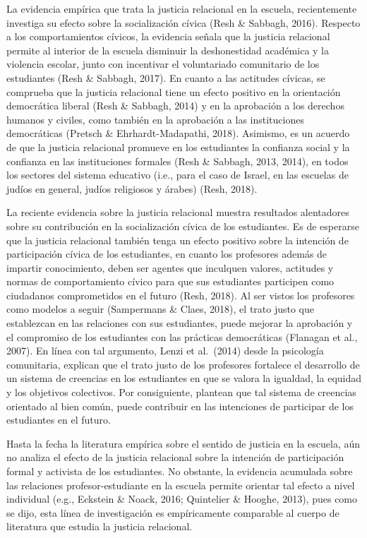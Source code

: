 \documentclass[12pt,twoside]{templates/facsothesis}
\begin{document}
La evidencia empírica que trata la justicia relacional en la escuela, recientemente investiga su efecto sobre la socialización cívica (Resh \& Sabbagh, 2016). Respecto a los comportamientos cívicos, la evidencia señala que la justicia relacional permite al interior de la escuela disminuir la deshonestidad académica y la violencia escolar, junto con incentivar el voluntariado comunitario de los estudiantes (Resh \& Sabbagh, 2017). En cuanto a las actitudes cívicas, se comprueba que la justicia relacional tiene un efecto positivo en la orientación democrática liberal (Resh \& Sabbagh, 2014) y en la aprobación a los derechos humanos y civiles, como también en la aprobación a las instituciones democráticas (Pretsch \& Ehrhardt-Madapathi, 2018). Asimismo, es un acuerdo de que la justicia relacional promueve en los estudiantes la confianza social y la confianza en las instituciones formales (Resh \& Sabbagh, 2013, 2014), en todos los sectores del sistema educativo (i.e., para el caso de Israel, en las escuelas de judíos en general, judíos religiosos y árabes) (Resh, 2018).

La reciente evidencia sobre la justicia relacional muestra resultados alentadores sobre su contribución en la socialización cívica de los estudiantes. Es de esperarse que la justicia relacional también tenga un efecto positivo sobre la intención de participación cívica de los estudiantes, en cuanto los profesores además de impartir conocimiento, deben ser agentes que inculquen valores, actitudes y normas de comportamiento cívico para que sus estudiantes participen como ciudadanos comprometidos en el futuro (Resh, 2018). Al ser vistos los profesores como modelos a seguir (Sampermans \& Claes, 2018), el trato justo que establezcan en las relaciones con sus estudiantes, puede mejorar la aprobación y el compromiso de los estudiantes con las prácticas democráticas (Flanagan et al., 2007). En línea con tal argumento, Lenzi et al.~(2014) desde la psicología comunitaria, explican que el trato justo de los profesores fortalece el desarrollo de un sistema de creencias en los estudiantes en que se valora la igualdad, la equidad y los objetivos colectivos. Por consiguiente, plantean que tal sistema de creencias orientado al bien común, puede contribuir en las intenciones de participar de los estudiantes en el futuro.

Hasta la fecha la literatura empírica sobre el sentido de justicia en la escuela, aún no analiza el efecto de la justicia relacional sobre la intención de participación formal y activista de los estudiantes. No obstante, la evidencia acumulada sobre las relaciones profesor-estudiante en la escuela permite orientar tal efecto a nivel individual (e.g., Eckstein \& Noack, 2016; Quintelier \& Hooghe, 2013), pues como se dijo, esta línea de investigación es empíricamente comparable al cuerpo de literatura que estudia la justicia relacional.
\end{document}
